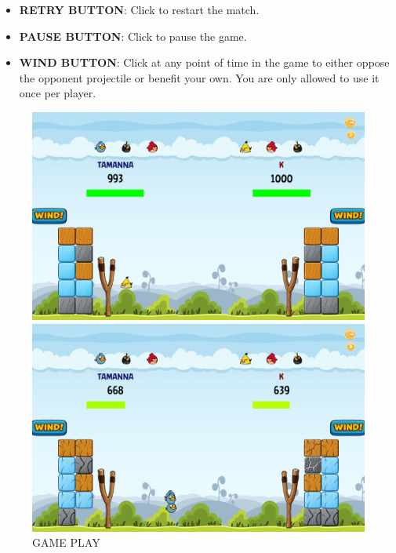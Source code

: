 \documentclass{article}
\begin{document}
\begin{itemize}
    \item \textbf{RETRY BUTTON}: Click to restart the match.
    \item \textbf{PAUSE BUTTON}: Click to pause the game.
    \item \textbf{WIND BUTTON}: Click at any point of time in the game to either 
    oppose the opponent projectile or benefit your own. You are only allowed to use it once per player.
\end{itemize}
\begin{figure}[h]
    \begin{minipage}[b]{0.4\linewidth}
        \centering
        \includegraphics[width = 1\textwidth,left]{bird_projectile.png}
    \end{minipage}
    \hspace{0.25\textwidth}
    \begin{minipage}[b]{0.4\linewidth}
        \centering
        \includegraphics[width = 1\textwidth,left]{blue_triplify.png}
    \end{minipage}
    \caption{GAME PLAY}
    \label{fig:GAME_PLAY}
\end{figure}
\end{document}
